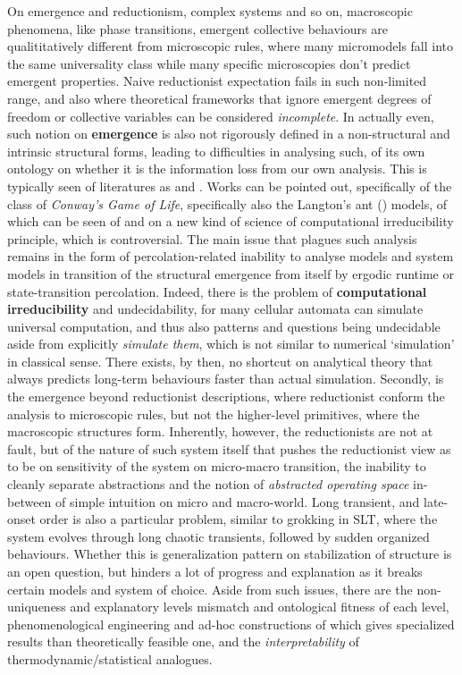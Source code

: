 \vspace{1mm}


On emergence and reductionism, complex systems and so on, macroscopic phenomena, like phase transitions, emergent collective behaviours are qualititatively different from microscopic rules, where many micromodels fall into the same universality class while many specific microscopies don't predict emergent properties. Naive reductionist expectation fails in such non-limited range, and also where theoretical frameworks that ignore emergent degrees of freedom or collective variables can be considered \textit{incomplete}. In actually even, such notion on \textbf{emergence} is also not rigorously defined in a non-structural and intrinsic structural forms, leading to difficulties in analysing such, of its own ontology on whether it is the information loss from our own analysis. This is typically seen of literatures as \cite{Anderson1972,Goldenfeld1992,LaughlinPines2000} and \cite{NicolisPrigogine1977}. Works can be pointed out, specifically of the class of \textit{Conway's Game of Life}, specifically also the Langton's ant (\cite{LangtonsAntWiki}) models, of which can be seen of \cite{Conway1970,HamannSchmicklCrailsheim2011,Cook2004,Cailleteau2017} and \cite{Wolfram2002,Rule110Wiki} on a new kind of science of computational irreducibility principle, which is controversial. The main issue that plagues such analysis remains in the form of percolation-related inability to analyse models and system models in transition of the structural emergence from itself by ergodic runtime or state-transition percolation. Indeed, there is the problem of \textbf{computational irreducibility} and undecidability, for many cellular automata can simulate universal computation, and thus also patterns and questions being undecidable aside from explicitly \textit{simulate them}, which is not similar to numerical `simulation' in classical sense. There exists, by then, no shortcut on analytical theory that always predicts long-term behaviours faster than actual simulation. Secondly, is the emergence beyond reductionist descriptions, where reductionist conform the analysis to microscopic rules, but not the higher-level primitives, where the macroscopic structures form. Inherently, however, the reductionists are not at fault, but of the nature of such system itself that pushes the reductionist view as to be on sensitivity of the system on micro-macro transition, the inability to cleanly separate abstractions and the notion of \textit{abstracted operating space} in-between of simple intuition on micro and macro-world. Long transient, and late-onset order is also a particular problem, similar to grokking in SLT, where the system evolves through long chaotic transients, followed by sudden organized behaviours. Whether this is generalization pattern on stabilization of structure is an open question, but hinders a lot of progress and explanation as it breaks certain models and system of choice. Aside from such issues, there are the non-uniqueness and explanatory levels mismatch and ontological fitness of each level, phenomenological engineering and ad-hoc constructions of which gives specialized results than theoretically feasible one, and the \textit{interpretability} of thermodynamic/statistical analogues. 

